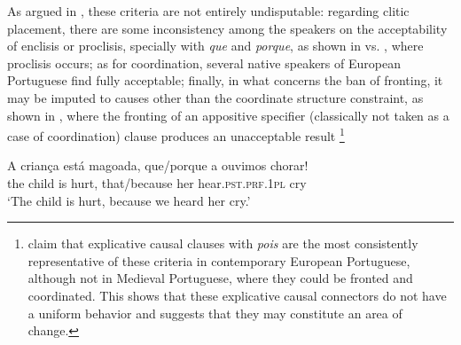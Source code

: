 \documentclass[output=paper,colorlinks,citecolor=brown,
]{langscibook}
\begin{document}
\ea \label{ex:matos:telefonei}
 \z
\z 

As argued in \citet{matos_coordenacao_2004}, these criteria are not entirely undisputable: regarding clitic placement, there are some inconsistency among the speakers on the acceptability of enclisis or proclisis, specially with \textit{que} and \textit{porque}, as shown in  vs. , where proclisis occurs; as for coordination, several native speakers of European Portuguese find  fully acceptable; finally, in what concerns the ban of fronting, it may be imputed to causes other than the coordinate structure constraint, as shown in , where the fronting of an appositive specifier (classically not taken as a case of coordination) clause produces an unacceptable result \footnote{\citet{fieis_para_2009} claim that explicative causal clauses with \textit{pois} are the most consistently representative of these criteria in contemporary European Portuguese, although not in Medieval Portuguese, where they could be fronted and coordinated. This shows that these explicative causal connectors do not have a uniform behavior and suggests that they may constitute an area of change.}

\ea \label{ex:matos:crianca-magoada}
\gll A criança está magoada, que/porque a ouvimos chorar!\\
     the child is hurt, that/because her hear.\textsc{pst}.\textsc{prf}.\textsc{1pl} cry\\
\glt ‘The child is hurt, because we heard her cry.’ 
\z 
\end{document}
